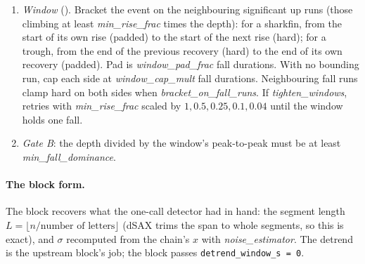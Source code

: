 \begin{enumerate}
  onsets closer than that, keep the deeper.
\item \emph{Window} (). Bracket the event on the neighbouring significant
  up runs (those climbing at least \emph{min\_rise\_frac} times the depth): for a sharkfin,
  from the start of its own rise (padded) to the start of the next rise (hard); for a trough,
  from the end of the previous recovery (hard) to the end of its own recovery (padded). Pad is
  \emph{window\_pad\_frac} fall durations. With no bounding run, cap each side at
  \emph{window\_cap\_mult} fall durations. Neighbouring fall runs clamp hard on both sides when
  \emph{bracket\_on\_fall\_runs}. If \emph{tighten\_windows},  retries with
  \emph{min\_rise\_frac} scaled by $1, 0.5, 0.25, 0.1, 0.04$ until the window holds one fall.
\item \emph{Gate B}: the depth divided by the window's peak-to-peak must be at least
  \emph{min\_fall\_dominance}.
\end{enumerate}

\paragraph{The block form.} The block recovers what the one-call detector had in hand: the
segment length $L = \lfloor n / \text{number of letters}\rfloor$ (dSAX trims the span to whole
segments, so this is exact), and $\sigma$ recomputed from the chain's $x$ with
\emph{noise\_estimator}. The detrend is the upstream block's job; the block passes
\texttt{detrend\_window\_s = 0}.

